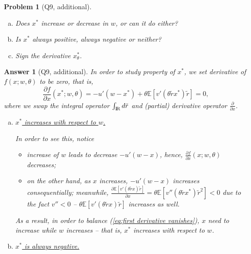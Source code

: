 \documentclass{article}
\newtheorem*{ans}{Answer}
\newtheorem*{prob}{{\bf Problem}}
\newcommand {\Reals}  {{\rm I \! R}}
\newcommand{\1}{{\bf 1}}
\newcommand{\bbE}{\mathbb{E}}
\newcommand{\0}{{\mathbf{0}}}
\newcommand{\<}{\langle}
\renewcommand{\>}{\rangle}
\begin{document}
\begin{prob}[Q9, additional] \begin{enumerate}[(a)]
		\item  Does $x^*$ increase or decrease in $w$, or can it do either?
		\item Is $x^*$ always positive, always negative or neither?
		\item Sign the derivative $x_{ \theta}^*$.
	\end{enumerate}
	
\end{prob}

\begin{ans}[Q9, additional]
		
	In order to study property of $x^*$, we set derivative of $f(x;w,\theta)$ to be zero, that is,
\begin{equation}
\label{eq:first derivative vanishes}
	\frac{\partial f}{\partial x} (x^*; w, \theta) =  - u'(w- x^*) +\theta  \bbE\left[ v' (\theta\tilde r x^*) \tilde r\right] =0,
	\end{equation}
	where we swap the integral operator $\int_{\Reals}  d\tilde r$ and (partial) derivative operator $		\frac{\partial}{\partial x}$. 	
	\begin{enumerate}[(a)]
		\item \underline{$x^*$ increases with respect to $w$.} 
		
		In order to see this, notice 
		\begin{itemize}
			\item 
increase of $w$ leads to decrease $-u'(w-x)$, hence, $	\frac{\partial f}{\partial x} (x; w, \theta)$ decreases; 
\item on the other hand, as $x$ increases, $-u'(w-x)$ increases consequentially; meanwhile, $\frac{\partial  \bbE\left[ v' (\theta\tilde r x) \tilde r\right] }{\partial x}  = \theta \bbE\left[ v'' (\theta\tilde r x^*) \tilde r^2 \right] <0$ due to the fact $v''<0$ -- $\theta \bbE\left[ v' (\theta\tilde r x) \tilde r\right] $ increases as well.
 
		\end{itemize}
As a result, in order to balance (\ref{eq:first derivative vanishes}), $x$ need to increase while $w$ increases -- that is, $x^*$ increases with respect to $w$.
		\item \underline{$x^*$ is always negative.} 
		

\end{enumerate}
\end{ans}
\end{document}
